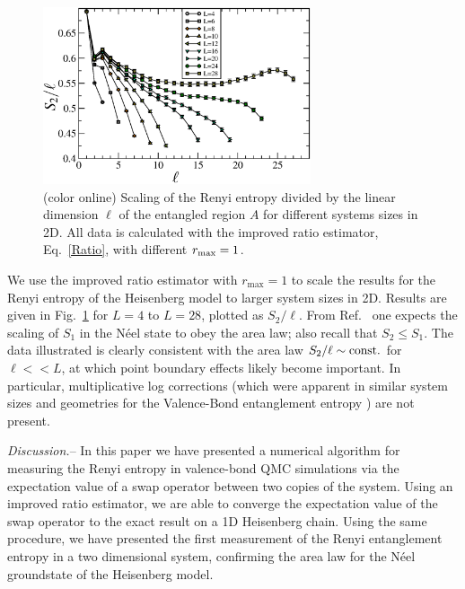 \documentclass[prl,aps,twocolumn,floatfix,amsmath,amssymb,superscriptaddress,tightenlines]{revtex4}
\begin{document}
\begin{figure} {
\includegraphics[width=3.1in]{fig4.eps} \caption{(color online) 
\label{fig4}
Scaling of the Renyi entropy divided by the linear dimension $\ell$ of the entangled region $A$ for different systems sizes
in 2D.  All data is calculated with the improved ratio estimator, Eq.~\eqref{Ratio}, with different $r_{\rm max}=1$.  
}
} \end{figure}

We use the improved ratio estimator with $r_{\max}=1$ to scale the results for the Renyi entropy of the Heisenberg model to larger system sizes in 2D.  Results are given in Fig.~\ref{fig4} for $L=4$ to $L=28$, plotted as $S_2/\ell$.  From  Ref.~\cite{Ann}
one expects the scaling of $S_1$ in the N\'eel state to obey the area law; also recall that $S_2 \leq S_1$.  
The data illustrated is clearly consistent with the area law $S_2/\ell \sim {\rm const.}$ for $\ell<<L$, at which point boundary 
effects likely become important.  In particular, multiplicative log corrections (which were apparent in similar system sizes and geometries for the Valence-Bond entanglement entropy
\cite{Alet,Chh}) are not present.

{\it Discussion.}-- 
In this paper we have presented a numerical algorithm for measuring the Renyi entropy in valence-bond QMC simulations via
the expectation value of a swap operator between two copies of the system.
Using an improved ratio estimator, we are able to converge the expectation value of the swap operator to the exact
result on a 1D Heisenberg chain.
Using the same procedure, we have presented the first measurement of the Renyi entanglement entropy in a two dimensional system, confirming the area law for the N\'eel groundstate of the Heisenberg model.
\end{document}
